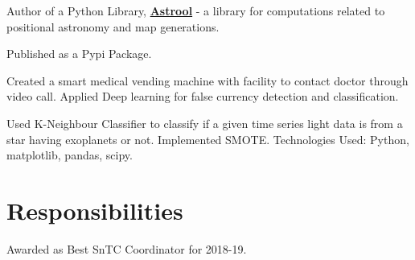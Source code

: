 \documentclass[a4paper]{deedy-resume-openfont}
\begin{document}
\begin{minipage}[t]{0.66\textwidth}
\begin{tightemize}
\item Author of a Python Library, \textbf{\href{http://github.com/astrool/astrool}{Astrool}} - a library for computations related to positional astronomy and map generations. 
\item Published as a Pypi Package.
\end{tightemize}
\sectionsep

Created a smart medical vending machine with facility to contact doctor through video call. Applied Deep learning for false currency detection and classification.
\sectionsep

Used K-Neighbour Classifier to classify if a given time series light data is from a star having exoplanets or not. Implemented SMOTE. 
Technologies Used: Python, matplotlib, pandas, scipy.











\section{Responsibilities} 
Awarded as Best SnTC Coordinator for 2018-19.
\sectionsep

\end{minipage} 
\end{document}
